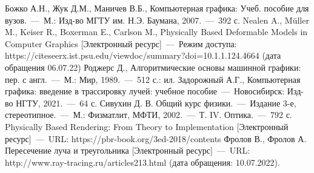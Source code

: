 \begin{thebibliography}{}
	 Божко А.Н., Жук Д.М., Маничев В.Б., Компьютерная графика: Учеб.
	пособие для вузов.~---~М.: Изд-во МГТУ им. Н.Э. Баумана, 2007.~---~392 с.
	 Nealen A., Müller M., Keiser R., Boxerman E., Carlson M., Physically Based
	Deformable Models in Computer Graphics [Электронный ресурс]~---~Режим доступа:
	https://citeseerx.ist.psu.edu/viewdoc/summary?doi=10.1.1.124.4664 (дата обращения
	06.07.22)
	 Роджерс Д., Алгоритмические основы машинной графики: пер. с англ.~---~М.: Мир, 1989.~---~512 с.: ил.
	 Задорожный А.Г., Компьютерная графика: введение в трассировку лучей:
	учебное пособие~---~Новосибирск: Изд-во НГТУ, 2021.~---~64 с.
	 Сивухин Д. В. Общий курс физики.~---~Издание 3-е, стереотипное.~---~М.:
	Физматлит, МФТИ, 2002.~---~Т. IV. Оптика.~---~792 с.
	 Physically Based Rendering: From Theory to Implementation [Электронный ресурс]~---~URL: https://pbr-book.org/3ed-2018/contents
	 Фролов В., Фролов А. Пересечение луча и треугольника [Электронный ресурс]~---~URL: http://www.ray-tracing.ru/articles213.html (дата обращения: 10.07.2022).
\end{thebibliography}
